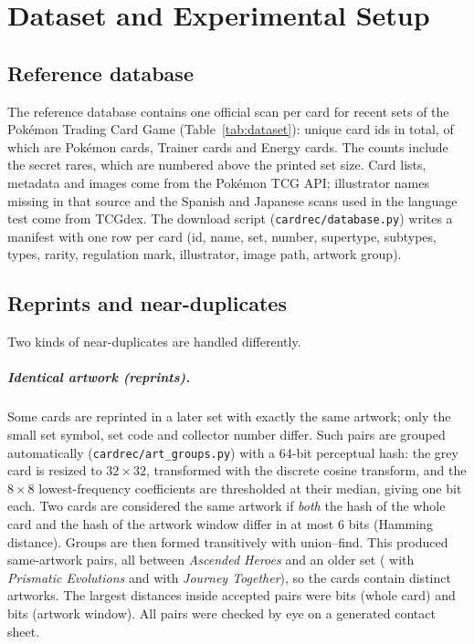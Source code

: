 \chapter{Dataset and Experimental Setup}
\label{ch:data}


\section{Reference database}

The reference database contains one official scan per card for  recent sets of the Pok\'emon Trading Card Game (Table~\ref{tab:dataset}):  unique card ids in total, of which  are Pok\'emon cards,  Trainer cards and  Energy cards. The counts include the secret rares, which are numbered above the printed set size. Card lists, metadata and images come from the Pok\'emon TCG API; illustrator names missing in that source and the Spanish and Japanese scans used in the language test come from TCGdex. The download script (\texttt{cardrec/database.py}) writes a manifest with one row per card (id, name, set, number, supertype, subtypes, types, rarity, regulation mark, illustrator, image path, artwork group).



\section{Reprints and near-duplicates}
\label{sec:reprints}

Two kinds of near-duplicates are handled differently.

\paragraph{Identical artwork (reprints).} Some cards are reprinted in a later set with exactly the same artwork; only the small set symbol, set code and collector number differ. Such pairs are grouped automatically (\texttt{cardrec/art\_groups.py}) with a 64-bit perceptual hash: the grey card is resized to $32\times32$, transformed with the discrete cosine transform, and the $8\times8$ lowest-frequency coefficients are thresholded at their median, giving one bit each. Two cards are considered the same artwork if \emph{both} the hash of the whole card and the hash of the artwork window differ in at most 6 bits (Hamming distance). Groups are then formed transitively with union--find. This produced  same-artwork pairs, all between \emph{Ascended Heroes} and an older set ( with \emph{Prismatic Evolutions} and  with \emph{Journey Together}), so the  cards contain  distinct artworks. The largest distances inside accepted pairs were  bits (whole card) and  bits (artwork window). All pairs were checked by eye on a generated contact sheet.

